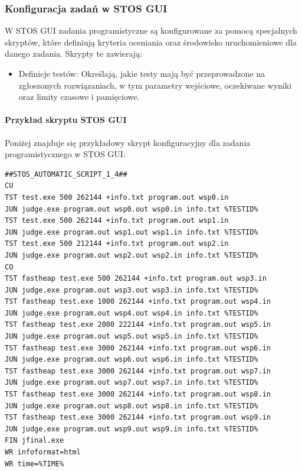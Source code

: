 \documentclass[12pt,a4paper]{article}
\begin{document}
\subsubsection{Konfiguracja zadań w STOS GUI}
W STOS GUI zadania programistyczne są konfigurowane za pomocą specjalnych skryptów, które definiują kryteria oceniania oraz środowisko uruchomieniowe dla danego zadania. Skrypty te zawierają:
\begin{itemize}
    \item Definicje testów: Określają, jakie testy mają być przeprowadzone na zgłoszonych rozwiązaniach, w tym parametry wejściowe, oczekiwane wyniki oraz limity czasowe i pamięciowe.
\end{itemize}

\paragraph{Przykład skryptu STOS GUI}

Poniżej znajduje się przykładowy skrypt konfiguracyjny dla zadania programistycznego w STOS GUI:\

\begin{samepage}
\begin{lstlisting}[style=envstyle]
##STOS_AUTOMATIC_SCRIPT_1_4##
CU
TST test.exe 500 262144 +info.txt program.out wsp0.in
JUN judge.exe program.out wsp0.out wsp0.in info.txt %TESTID%
TST test.exe 500 262144 +info.txt program.out wsp1.in
JUN judge.exe program.out wsp1.out wsp1.in info.txt %TESTID%
TST test.exe 500 212144 +info.txt program.out wsp2.in
JUN judge.exe program.out wsp2.out wsp2.in info.txt %TESTID%
CO
TST fastheap test.exe 500 262144 +info.txt program.out wsp3.in
JUN judge.exe program.out wsp3.out wsp3.in info.txt %TESTID%
TST fastheap test.exe 1000 262144 +info.txt program.out wsp4.in
JUN judge.exe program.out wsp4.out wsp4.in info.txt %TESTID%
TST fastheap test.exe 2000 222144 +info.txt program.out wsp5.in
JUN judge.exe program.out wsp5.out wsp5.in info.txt %TESTID%
TST fastheap test.exe 3000 262144 +info.txt program.out wsp6.in
JUN judge.exe program.out wsp6.out wsp6.in info.txt %TESTID%
TST fastheap test.exe 3000 262144 +info.txt program.out wsp7.in
JUN judge.exe program.out wsp7.out wsp7.in info.txt %TESTID%
TST fastheap test.exe 3000 262144 +info.txt program.out wsp8.in
JUN judge.exe program.out wsp8.out wsp8.in info.txt %TESTID%
TST fastheap test.exe 3000 262144 +info.txt program.out wsp9.in
JUN judge.exe program.out wsp9.out wsp9.in info.txt %TESTID%
FIN jfinal.exe
WR infoformat=html
WR time=%TIME%
\end{lstlisting}
\end{samepage}
\end{document}
